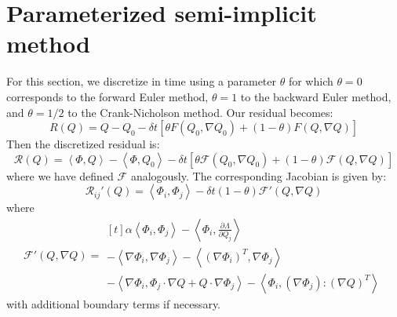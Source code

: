\documentclass[reqno]{article}
\begin{document}
\section{Parameterized semi-implicit method}
For this section, we discretize in time using a parameter $\theta$ for which $\theta = 0$ corresponds to the forward Euler method, $\theta = 1$ to the backward Euler method, and $\theta = 1/2$ to the Crank-Nicholson method.
Our residual becomes:
\begin{equation}
    R(Q)
    =
    Q - Q_0
    - \delta t
    \left[ \theta F(Q_0, \nabla Q_0) + (1 - \theta) F(Q, \nabla Q) \right]
\end{equation}
Then the discretized residual is:
\begin{equation}
    \mathcal{R}(Q)
    =
    \left< \Phi, Q \right>
    - \left< \Phi, Q_0 \right>
    - \delta t \left[ \theta \mathcal{F}(Q_0, \nabla Q_0) + (1 - \theta) \mathcal{F}(Q, \nabla Q) \right]
\end{equation}
where we have defined $\mathcal{F}$ analogously.
The corresponding Jacobian is given by:
\begin{equation}
    \mathcal{R}_{ij}'(Q)
    =
    \left< \Phi_i, \Phi_j \right>
    - \delta t (1 - \theta) \mathcal{F}'(Q, \nabla Q)
\end{equation}
where
\begin{equation}
    \mathcal{F}'(Q, \nabla Q)
    =
    \begin{multlined}[t]
    \alpha \left< \Phi_i, \Phi_j \right>
    - \left< \Phi_i, \frac{\partial \Lambda}{\partial Q_j} \right> \\
    - \left< \nabla \Phi_i, \nabla \Phi_j \right>
    - \left< \left(\nabla \Phi_i \right)^T, \nabla \Phi_j \right> \\
    - \left< \nabla \Phi_i, \Phi_j \cdot \nabla Q + Q \cdot \nabla \Phi_j \right>
    - \left< \Phi_i, \left(\nabla \Phi_j\right) : \left(\nabla Q \right)^T \right>
    \end{multlined}
\end{equation}
with additional boundary terms if necessary.
\end{document}
